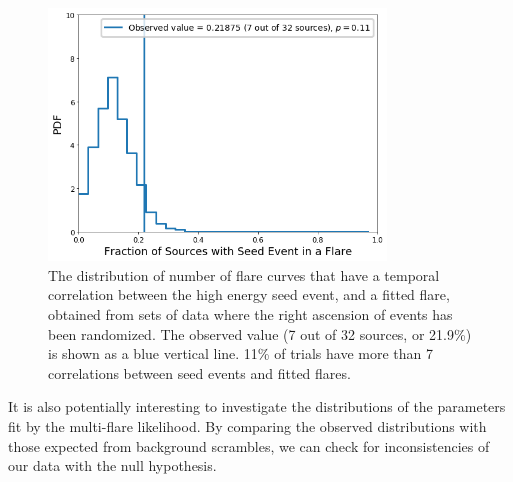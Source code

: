 \begin{figure}[h]
\centering
\includegraphics[width=0.8\textwidth]{figs/evtflarecorr.png}
\caption{The distribution of number of flare curves that have a temporal correlation between the high energy seed event, and a fitted flare, obtained from sets of data where the right ascension of events has been randomized. The observed value (7 out of 32 sources, or 21.9\%) is shown as a blue vertical line. 11\% of trials have more than 7 correlations between seed events and fitted flares.}
\label{fig:stresults}
\end{figure}

It is also potentially interesting to investigate the distributions of the parameters fit by the multi-flare likelihood. By comparing the observed distributions with those expected from background scrambles, we can check for inconsistencies of our data with the null hypothesis. 

